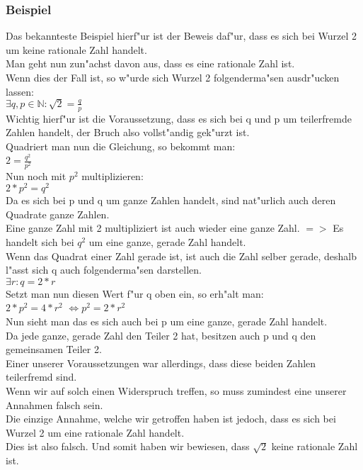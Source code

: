 \subsubsection{Beispiel}
Das bekannteste Beispiel hierf"ur ist der Beweis daf"ur, dass es sich bei Wurzel 2 um keine rationale Zahl handelt.\\
Man geht nun zun"achst davon aus, dass es eine rationale Zahl ist.\\
Wenn dies der Fall ist, so w"urde sich Wurzel 2 folgenderma"sen ausdr"ucken lassen:\\
$\exists q, p \in \mathbb{N}:\sqrt{2}=\frac{q}{p}$\\
Wichtig hierf"ur ist die Voraussetzung, dass es sich bei q und p um teilerfremde Zahlen handelt, der Bruch also vollst"andig gek"urzt ist.\\
Quadriert man nun die Gleichung, so bekommt man:\\
$2 = \frac{q^2}{p^2}$\\
Nun noch mit $p^2$ multiplizieren:\\
$2 * p^2 = q^2$\\
Da es sich bei p und q um ganze Zahlen handelt, sind nat"urlich auch deren Quadrate ganze Zahlen.\\
Eine ganze Zahl mit 2 multipliziert ist auch wieder eine ganze Zahl. $=>$ Es handelt sich bei $q^2$ um eine ganze, gerade Zahl handelt.\\
Wenn das Quadrat einer Zahl gerade ist, ist auch die Zahl selber gerade, deshalb l"asst sich q auch folgenderma"sen darstellen.\\
$\exists r : q = 2 * r$\\
Setzt man nun diesen Wert f"ur q oben ein, so erh"alt man:\\
$2 * p^2 = 4 * r^2$
$\Leftrightarrow p^2 = 2 * r^2$\\
Nun sieht man das es sich auch bei p um eine ganze, gerade Zahl handelt.\\
Da jede ganze, gerade Zahl den Teiler 2 hat, besitzen auch p und q den gemeinsamen Teiler 2.\\
Einer unserer Voraussetzungen war allerdings, dass diese beiden Zahlen teilerfremd sind.\\
Wenn wir auf solch einen Widerspruch treffen, so muss zumindest eine unserer Annahmen falsch sein.\\
Die einzige Annahme, welche wir getroffen haben ist jedoch, dass es sich bei Wurzel 2 um eine rationale Zahl handelt.\\
Dies ist also falsch. Und somit haben wir bewiesen, dass $\sqrt{2}$ keine rationale Zahl ist.

